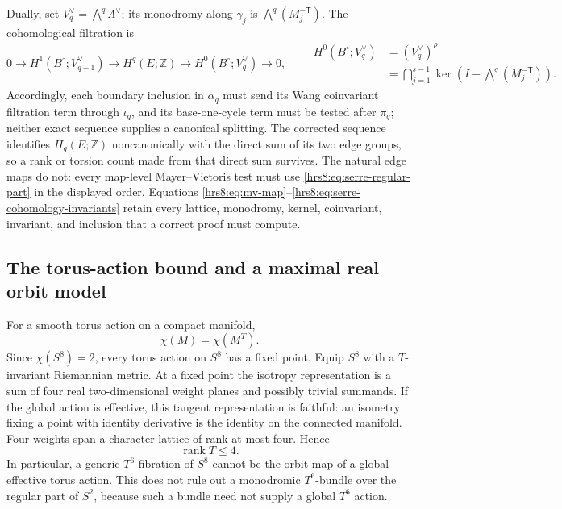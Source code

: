 Dually, set \(V_q^\vee=\bigwedge^q\Lambda^\vee\); its monodromy along
\(\gamma_j\) is \(\bigwedge^q(M_j^{-\mathsf T})\).  The cohomological
filtration is
\begin{equation}
 0\longrightarrow H^1(B^\circ;V_{q-1}^\vee)
 \longrightarrow H^q(E;\mathbb Z)
 \longrightarrow H^0(B^\circ;V_q^\vee)\longrightarrow0,
 \qquad
 \begin{aligned}
 H^0(B^\circ;V_q^\vee)
   &=(V_q^\vee)^\rho\\
   &=\bigcap_{j=1}^{s-1}
     \ker\!\left(I-\textstyle\bigwedge^q(M_j^{-\mathsf T})\right).
 \end{aligned}
 \label{hrs8:eq:serre-cohomology-invariants}
\end{equation}
Accordingly, each boundary inclusion in \(\alpha_q\) must send its Wang
coinvariant filtration term through \(\iota_q\), and its base-one-cycle
term must be tested after \(\pi_q\); neither exact sequence supplies a
canonical splitting.  The corrected sequence identifies \(H_q(E;\mathbb Z)\)
noncanonically with the direct sum of its two edge groups, so a rank or
torsion count made from that direct sum survives.  The natural edge maps do
not: every map-level Mayer--Vietoris test must use
\eqref{hrs8:eq:serre-regular-part} in the displayed order.  Equations
\eqref{hrs8:eq:mv-map}--\eqref{hrs8:eq:serre-cohomology-invariants} retain
every lattice, monodromy, kernel, coinvariant, invariant, and inclusion
that a correct proof must compute.

\subsection{The torus-action bound and a maximal real orbit model}
\label{hrs8:subsec:torus-action}

For a smooth torus action on a compact manifold,
\[
 \chi(M)=\chi(M^T).
\]
Since $\chi(S^8)=2$, every torus action on $S^8$ has a fixed point.  Equip
$S^8$ with a $T$-invariant Riemannian metric.  At a fixed point the isotropy
representation is a sum of four real two-dimensional weight planes and
possibly trivial summands.  If the global action is effective, this tangent
representation is faithful: an isometry fixing a point with identity
derivative is the identity on the connected manifold.  Four weights span a
character lattice of rank at most four.  Hence
\begin{equation}
 \boxed{\operatorname{rank}T\leq4.}
 \label{hrs8:eq:torus-rank}
\end{equation}
In particular, a generic $T^6$ fibration of $S^8$ cannot be the orbit map of
a global effective torus action.  This does not rule out a monodromic
$T^6$-bundle over the regular part of $S^2$, because such a bundle need not
supply a global $T^6$ action.


